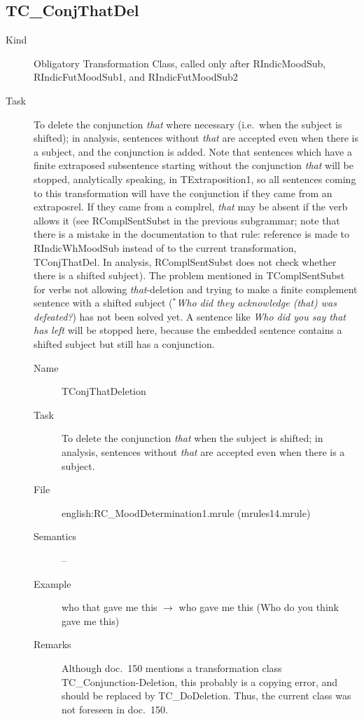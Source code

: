 \begin{description}
\end{description}

\newpage
\subsection{TC\_ConjThatDel}
\begin{description}
\item[Kind] Obligatory Transformation Class, called only after RIndicMoodSub,
RIndicFutMoodSub1, and RIndicFutMoodSub2
\item[Task] To delete the conjunction {\em that\/} where necessary (i.e.\ when
the subject is shifted); in analysis, sentences without {\em that\/} are 
accepted even when there is a subject, and the conjunction is added. Note that 
sentences which have 
a finite extraposed subsentence starting without the conjunction {\em that\/}
will be stopped, analytically speaking, in TExtraposition1, so all sentences 
coming to this transformation will have the conjunction if they came from an 
extraposrel. If they came from a complrel, {\em that\/} may be absent if the 
verb allows it (see RComplSentSubst in the previous subgrammar; note that there 
is a mistake in the documentation to that rule: reference is made to 
RIndicWhMoodSub instead of to the current transformation, TConjThatDel. In 
analysis, RComplSentSubst does not check whether there is a shifted subject).
The problem mentioned in TCompl\-SentSubst for verbs not allowing 
{\em that\/}-deletion and trying to make a finite complement sentence with a 
shifted subject ({\em $^{*}$Who did they acknowledge (that) was defeated?\/})
has not been solved yet. A sentence like {\em Who did you say that 
has left\/} will be stopped here, because the embedded sentence contains a 
shifted subject but still has a conjunction.

\vspace{1 cm}
\begin{description}
\item[Name] TConjThatDeletion 
\item[Task] To delete the conjunction {\em that\/} when
the subject is shifted; in analysis, sentences without {\em that\/} are 
accepted even when there is a subject.
\item[File] english:RC\_MoodDetermination1.mrule (mrules14.mrule)
\item[Semantics] --
\item[Example]  who that gave me this $\rightarrow$ who gave me this (Who do 
you think gave me this)
\item[Remarks] Although doc.\ 150 mentions a transformation class 
TC\_Conjunction-Deletion, this probably is a copying error, and should be 
replaced by TC\_DoDeletion. Thus, the current class was not foreseen in doc.\ 
150.
\end{description}

\end{description}

